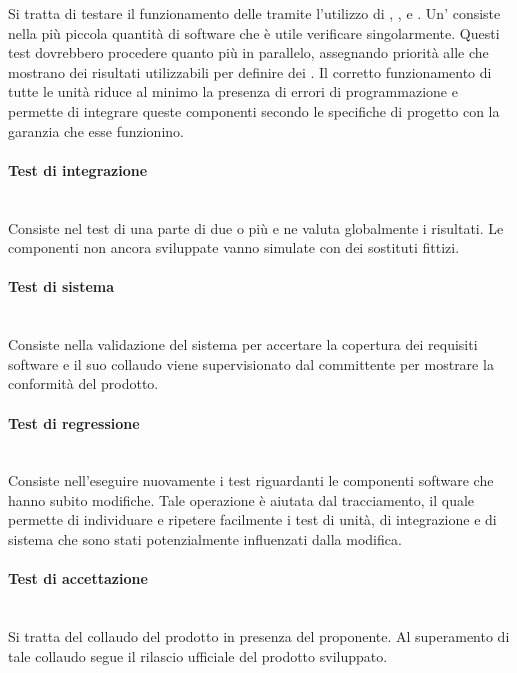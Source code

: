 			Si tratta di testare il funzionamento delle  tramite l'utilizzo di , , e . Un' consiste nella più piccola quantità di software che è utile verificare singolarmente.
			Questi test dovrebbero procedere quanto più in parallelo, assegnando priorità alle  che mostrano dei risultati utilizzabili per definire dei . Il corretto funzionamento di tutte le unità riduce al minimo la presenza di errori di programmazione e permette di integrare queste componenti secondo le specifiche di progetto con la garanzia che esse funzionino.
			 
			\paragraph{Test di integrazione} \mbox{} \\

			Consiste nel test di una parte di due o più  e ne valuta globalmente i risultati. Le componenti non ancora sviluppate vanno simulate con dei sostituti fittizi.
			
			\paragraph{Test di sistema} \mbox{} \\

			Consiste nella validazione del sistema per accertare la copertura dei requisiti software e il suo collaudo viene supervisionato dal committente per mostrare la conformità del prodotto.
			
			\paragraph{Test di regressione} \mbox{} \\

			Consiste nell'eseguire nuovamente i test riguardanti le componenti software che hanno subito modifiche.	Tale operazione è aiutata dal tracciamento, il quale permette di individuare e ripetere facilmente i test di unità, di integrazione e di sistema che sono stati potenzialmente influenzati dalla modifica.
			
			\paragraph{Test di accettazione} \mbox{} \\

			Si tratta del collaudo del prodotto in presenza del proponente. Al superamento di tale collaudo segue il rilascio ufficiale del prodotto sviluppato.
			
	

